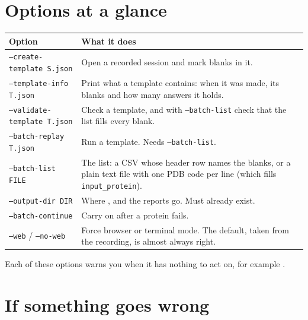 \section{Options at a glance}
\label{sec:batch-list}

\begin{tabularx}{\linewidth}{@{}lL@{}}
\toprule
\textbf{Option} & \textbf{What it does} \\
\midrule
\texttt{--create-template S.json} & Open a recorded session and mark blanks in
  it. \\
\texttt{--template-info T.json} & Print what a template contains: when it was
  made, its blanks and how many answers it holds. \\
\texttt{--validate-template T.json} & Check a template, and with
  \texttt{--batch-list} check that the list fills every blank. \\
\texttt{--batch-replay T.json} & Run a template. Needs
  \texttt{--batch-list}. \\
\texttt{--batch-list FILE} & The list: a CSV whose header row names the
  blanks, or a plain text file with one PDB code per line (which fills
  \texttt{input\_protein}). \\
\texttt{--output-dir DIR} & Where ,  and the
  reports go. Must already exist. \\
\texttt{--batch-continue} & Carry on after a protein fails. \\
\texttt{--web} / \texttt{--no-web} & Force browser or terminal mode. The
  default, taken from the recording, is almost always right. \\
\bottomrule
\end{tabularx}

\medskip
Each of these options warns you when it has nothing to act on, for example
.

\section{If something goes wrong}

